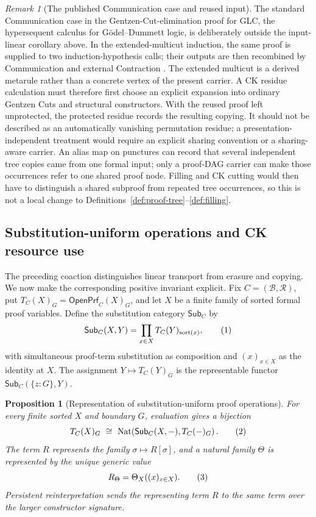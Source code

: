 \documentclass[10pt,a4paper]{article}
\theoremstyle{plain}
\newtheorem{proposition}[theorem]{Proposition}
\theoremstyle{definition}
\theoremstyle{remark}
\newtheorem{remark}[theorem]{Remark}
\newcommand{\Base}{\mathcal B}
\newcommand{\Rules}{\mathcal R}
\newcommand{\OpenPrf}{\mathsf{OpenPrf}}
\newcommand{\eqtag}{\refstepcounter{equation}\tag{\theequation}}
\begin{document}
\begin{remark}[The published Communication case and reused input]
\label{rem:communication-multicut-scope}
The standard Communication case in the Gentzen-Cut-elimination proof for
GLC, the hypersequent calculus for G\"odel--Dummett logic, is deliberately
outside the input-linear corollary above.  In
the extended-multicut induction, the same proof is supplied to two
induction-hypothesis calls; their outputs are then recombined by
Communication and external Contraction
\cite[\S3.1, proof of Theorem~11]{baazciabattonifermuller2003}.
The extended multicut is a derived metarule rather than a concrete vertex
of the present carrier.  A CK residue calculation must therefore first
choose an explicit expansion into ordinary Gentzen Cuts and structural
constructors.  With the reused proof left unprotected, the protected
residue records the resulting copying.  It should not be described as an
automatically vanishing permutation residue; a presentation-independent
treatment would require an explicit sharing convention or a
sharing-aware carrier.  An alias map on punctures can record that several
independent tree copies came from one formal input; only a proof-DAG carrier
can make those occurrences refer to one shared proof node.  Filling and CK
cutting would then have to distinguish a shared subproof from repeated tree
occurrences, so this is not a local change to
Definitions~\ref{def:proof-tree}--\ref{def:filling}.
\end{remark}

\subsection{Substitution-uniform operations and CK resource use}
\label{subsec:resource-use}

The preceding coaction distinguishes linear transport from erasure and
copying.  We now make the corresponding positive invariant explicit.  Fix
\(C=(\Base,\Rules)\), put
\(T_C(X)_G=\OpenPrf_C(X)_G\), and let \(X\) be a finite family of sorted
formal proof variables.  Define the substitution category
\(\mathsf{Sub}_C\) by
\[
 \mathsf{Sub}_C(X,Y)
   =\prod_{x\in X}T_C(Y)_{\operatorname{sort}(x)},
\eqtag\label{eq:proof-substitution-category}
\]
with simultaneous proof-term substitution as composition and
\((x)_{x\in X}\) as the identity at \(X\).  The assignment
\(Y\mapsto T_C(Y)_G\) is the representable functor
\(\mathsf{Sub}_C(\{z:G\},Y)\).

\begin{proposition}[Representation of substitution-uniform proof operations]
\label{prop:substitution-yoneda}
For every finite sorted \(X\) and boundary \(G\), evaluation gives a
bijection
\[
 T_C(X)_G
 \ \cong\
 \operatorname{Nat}\!\left(
     \mathsf{Sub}_C(X,-),T_C(-)_G\right).
\eqtag\label{eq:substitution-yoneda}
\]
The term \(R\) represents the family
\(\sigma\mapsto R[\sigma]\), and a natural family \(\Theta\) is represented
by the unique generic value
\[
                    R_\Theta=\Theta_X((x)_{x\in X}).
\eqtag\label{eq:uniform-operation-generic-value}
\]
Persistent reinterpretation sends the representing term \(R\) to the same
term over the larger constructor signature.
\end{proposition}
\end{document}
